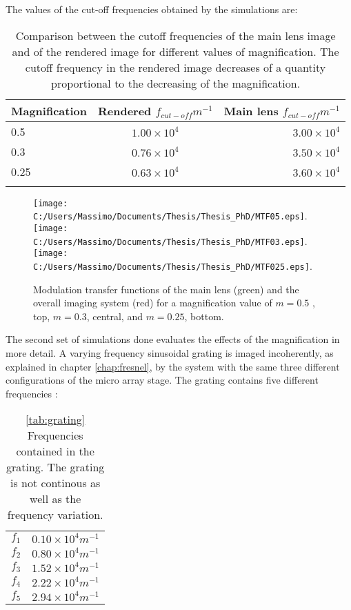The values of the cut-off frequencies obtained by the simulations are:
\begin{table}
	\centering
	\begin{tabular}{l|c|r}
		Magnification & Rendered $f_{cut-off}m^{-1}$ & Main lens $f_{cut-off}m^{-1}$\\ \hline
		0.5 & $1.00 \times 10^{4}$ &  $3.00 \times 10^{4}$ \\ \hline
		0.3 & $0.76 \times 10^{4}$ &  $3.50 \times 10^{4}$ \\ \hline
		0.25 & $0.63\times 10^{4}$ &  $3.60\times 10^{4}$  \\ 
		\label{tab:6}
	\end{tabular}
	\caption{\label{tab:cutoff} Comparison between the cutoff frequencies of the main lens image and of the rendered image for different values of magnification. The cutoff frequency in the rendered image decreases of a quantity proportional to the decreasing of the magnification.}
\end{table} 
\begin{figure}[H]
	\centering
	\texttt{[image: C:/Users/Massimo/Documents/Thesis/Thesis\_PhD/MTF05.eps]}.
	\texttt{[image: C:/Users/Massimo/Documents/Thesis/Thesis\_PhD/MTF03.eps]}.
	\texttt{[image: C:/Users/Massimo/Documents/Thesis/Thesis\_PhD/MTF025.eps]}.
	\caption{\label{fig:MTF} Modulation transfer functions of the main lens (green) and the overall imaging system (red) for a magnification value of $m = 0.5$ , top, $m = 0.3$, central, and $m = 0.25$, bottom.}
\end{figure}
The second set of simulations done evaluates the effects of the magnification in more detail. A varying frequency sinusoidal grating is imaged incoherently, as explained in chapter \ref{chap:fresnel}, by the system with the same three different configurations of the micro array stage. The grating contains five different frequencies :
\begin{table}
\begin{tabular}{l|r}
	\centering
	$f_1$ & $0.10\times 10^4 m^{-1}$ \\
	$f_2$ & $0.80\times 10^4 m^{-1}$ \\
	$f_3$ & $1.52\times 10^4 m^{-1}$ \\
	$f_4$ & $2.22\times 10^4 m^{-1}$ \\
	$f_5$ & $2.94\times 10^4 m^{-1}$ \\
\end{tabular}
\caption{\ref{tab:grating} Frequencies contained in the grating. The grating is not continous as well as the frequency variation.}
\end{table}
